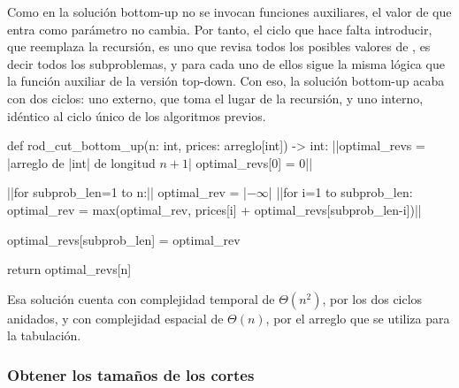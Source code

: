 Como en la solución bottom-up no se invocan funciones auxiliares, el valor de  que entra como parámetro no cambia. Por tanto, el ciclo que hace falta introducir, que reemplaza la recursión, es uno que revisa todos los posibles valores de , es decir todos los subproblemas, y para cada uno de ellos sigue la misma lógica que la función auxiliar de la versión top-down. Con eso, la solución bottom-up acaba con dos ciclos: uno externo, que toma el lugar de la recursión, y uno interno, idéntico al ciclo único de los algoritmos previos.

\begin{codeblock}
\begin{pseudocode}
def rod_cut_bottom_up(n: int, prices: arreglo[int]) -> int:
    ||optimal_revs = |\textrm{arreglo de }|int|\textrm{ de longitud \(n+1\)}|
    optimal_revs[0] = 0||

    ||for subprob_len=1 to n:||
        optimal_rev = |\(-\infty\)|
        ||for i=1 to subprob_len:
            optimal_rev = max(optimal_rev, prices[i] + optimal_revs[subprob_len-i])||

        optimal_revs[subprob_len] = optimal_rev
    
    return optimal_revs[n]
\end{pseudocode}
\begin{annotations}
\end{annotations}
\end{codeblock}

Esa solución cuenta con complejidad temporal de \(\Theta(n^2)\), por los dos ciclos anidados, y con complejidad espacial de \(\Theta(n)\), por el arreglo que se utiliza para la tabulación.

\subsubsection{Obtener los tamaños de los cortes}

